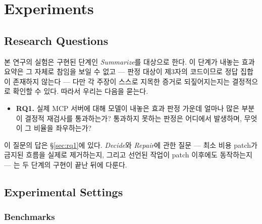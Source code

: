 \documentclass[acmsmall,screen,review,anonymous]{acmart}
\begin{document}
\section{Experiments}
\label{sec:eval}

\subsection{Research Questions}

본 연구의 실험은 구현된 단계인 \emph{Summarize}를 대상으로 한다. 이 단계가 내놓는 효과 요약은 그 자체로 참임을 보일 수 없고 --- 판정 대상이 제3자의 코드이므로 정답 집합이 존재하지 않는다 --- 다만 각 주장이 스스로 지목한 증거로 되짚어지는지는 결정적으로 확인할 수 있다. 따라서 우리는 다음을 묻는다.

\begin{itemize}
    \item \textbf{RQ1.} 실제 MCP 서버에 대해 모델이 내놓은 효과 판정 가운데 얼마나 많은 부분이 결정적 재검사를 통과하는가? 통과하지 못하는 판정은 어디에서 발생하며, 무엇이 그 비율을 좌우하는가?
\end{itemize}

이 질문의 답은 \S\ref{sec:rq1}에 있다. \emph{Decide}와 \emph{Repair}에 관한 질문 --- 최소 비용 patch가 금지된 흐름을 실제로 제거하는지, 그리고 선언된 작업이 patch 이후에도 동작하는지 --- 는 두 단계의 구현이 끝난 뒤에 다룬다.

\subsection{Experimental Settings}
\label{sec:settings}

\subsubsection{Benchmarks}
\end{document}
